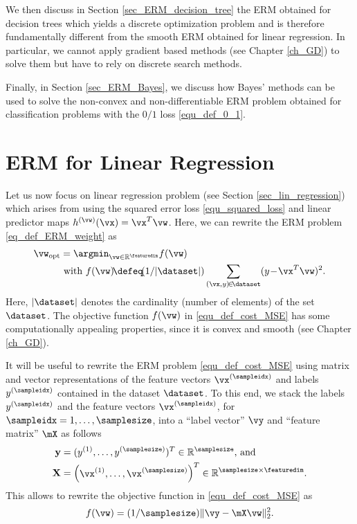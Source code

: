 \documentclass[12pt]{report}
\begin{document}
We then discuss in Section \ref{sec_ERM_decision_tree} the ERM obtained for decision trees 
which yields a discrete optimization problem and is therefore fundamentally different from the 
smooth ERM obtained for linear regression. In particular, we cannot apply gradient based 
methods (see Chapter \ref{ch_GD}) to solve them but have to rely on discrete search methods. 

Finally, in Section \ref{sec_ERM_Bayes}, we discuss how Bayes' methods can be used to solve 
the non-convex and non-differentiable ERM problem obtained for classification 
problems with the $0/1$ loss \eqref{equ_def_0_1}. 

\section{ERM for Linear Regression}
\label{sec_ERM_lin_reg}

Let us now focus on linear regression problem (see Section \ref{sec_lin_regression}) which arises from using the 
squared error loss \eqref{equ_squared_loss} and linear predictor maps $h^{(\vw)}(\vx) = \vx^{T} \vw$. 
Here, we can rewrite the ERM problem \eqref{eq_def_ERM_weight} as 
\begin{align}
\label{equ_def_cost_MSE}
\vw_{\rm opt} & = \argmin_{\vw \in \mathbb{R}^{\featuredim}} f(\vw) \nonumber \\ 
& \mbox{ with } f(\vw)\!\defeq\!(1/|\dataset|) \sum_{(\vx,y)\!\in\!\dataset} (y \!-\! \vx^{T} \vw )^2.
\end{align} 
Here, $|\dataset|$ denotes the cardinality (number of elements) of the set $\dataset$. 
The objective function $f(\vw)$ in \eqref{equ_def_cost_MSE} has some computationally 
appealing properties, since it is convex and smooth (see Chapter \ref{ch_GD}). 

It will be useful to rewrite the ERM problem \eqref{equ_def_cost_MSE} using matrix 
and vector representations of the feature vectors $\vx^{(\sampleidx)}$ and labels 
$y^{(\sampleidx)}$ contained in the dataset $\dataset$. To this end, we stack the 
labels $y^{(\sampleidx)}$ and the feature vectors $\vx^{(\sampleidx)}$, for 
$\sampleidx=1,\ldots,\samplesize$, into a ``label vector'' $\vy$ and ``feature matrix'' $\mX$ as follows
\begin{align}
\label{equ_def_vec_matrix}
\mathbf{y} & = ( y^{(1)},\ldots, y^{(\samplesize)})^{T} \in \mathbb{R}^{\samplesize} \mbox{, and } \nonumber \\ 
\mathbf{X} & = \begin{pmatrix} \vx^{(1)},\ldots,\vx^{(\samplesize)} \end{pmatrix}^{T}\in \mathbb{R}^{\samplesize \times \featuredim}.
\end{align}
This allows to rewrite the objective function in \eqref{equ_def_cost_MSE} as 
\begin{equation}
\label{equ_min_lin_pred_vec_mat}
f(\vw) = (1/\samplesize) \| \vy - \mX\vw \|^{2}_{2}.
\end{equation} 
\end{document}
